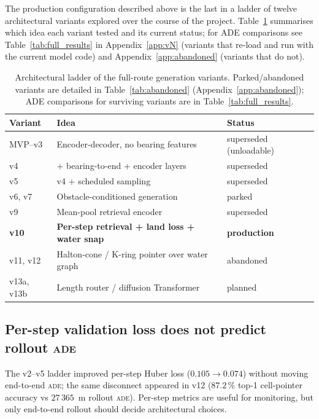 \documentclass[oneside, a4paper, onecolumn, 11pt]{article}
\newcommand{\ade}{\textsc{ade}}
\begin{document}
The production configuration described above is the last in a ladder
of twelve architectural variants explored over the course of the
project.  Table~\ref{tab:ladder} summarises which idea each variant
tested and its current status; for ADE comparisons see
Table~\ref{tab:full_results} in Appendix~\ref{app:vN} (variants that
re-load and run with the current model code) and
Appendix~\ref{app:abandoned} (variants that do not).

\begin{table}[h]
\centering
\caption{Architectural ladder of the full-route generation variants.
Parked/abandoned variants are detailed in
Table~\ref{tab:abandoned} (Appendix~\ref{app:abandoned}); ADE
comparisons for surviving variants are in
Table~\ref{tab:full_results}.}
\label{tab:ladder}
\small
\begin{tabular}{lll}
\toprule
\textbf{Variant} & \textbf{Idea} & \textbf{Status} \\
\midrule
MVP--v3      & Encoder-decoder, no bearing features  & superseded (unloadable) \\
v4          & + bearing-to-end + encoder layers     & superseded \\
v5          & v4 + scheduled sampling               & superseded \\
v6, v7      & Obstacle-conditioned generation       & parked \\
v9          & Mean-pool retrieval encoder           & superseded \\
\textbf{v10}& \textbf{Per-step retrieval + land loss + water snap}
            & \textbf{production} \\
v11, v12    & Halton-cone / K-ring pointer over water graph & abandoned \\
v13a, v13b  & Length router / diffusion Transformer & planned \\
\bottomrule
\end{tabular}
\end{table}

\subsection{Per-step validation loss does not predict rollout \ade}

The v2--v5 ladder improved per-step Huber loss
($0.105\!\to\!0.074$) without moving end-to-end \ade{}; the same
disconnect appeared in v12 ($87.2\,\%$ top-1 cell-pointer accuracy
vs $27\,365$~m rollout \ade{}).  Per-step metrics are useful for
monitoring, but only end-to-end rollout should decide architectural
choices.
\end{document}
